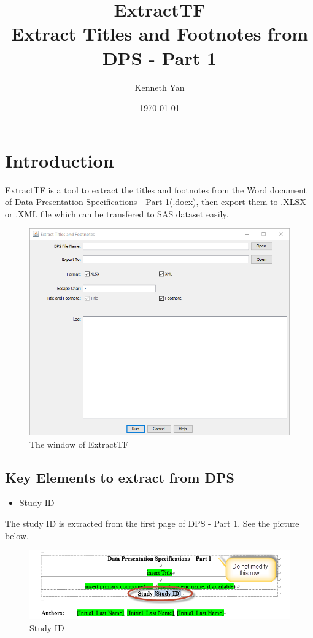 \documentclass[11pt]{article}
\author{Kenneth Yan}
\date{\today}
\title{ExtractTF\\\medskip
\large Extract Titles and Footnotes from DPS - Part 1}
\begin{document}
\maketitle
\setcounter{tocdepth}{2}
\tableofcontents

\section{Introduction}
\label{sec:org3607aed}
ExtractTF is a tool to extract the titles and footnotes from the Word document of Data Presentation Specifications - Part 1(.docx), then export them to .XLSX or .XML file which can be transfered to SAS dataset easily.

\begin{figure}[htbp]
\centering
\includegraphics[width=.9\linewidth]{./images/001.png}
\caption{The window of ExtractTF}
\end{figure}

\subsection{Key Elements to extract from DPS}
\label{sec:orga8eff2a}

\begin{itemize}
\item Study ID
\end{itemize}
The study ID is extracted from the first page of DPS - Part 1. See the picture below. 
\begin{figure}[htbp]
\centering
\includegraphics[width=.9\linewidth]{./images/002.png}
\caption{Study ID}
\end{figure}
\end{document}
